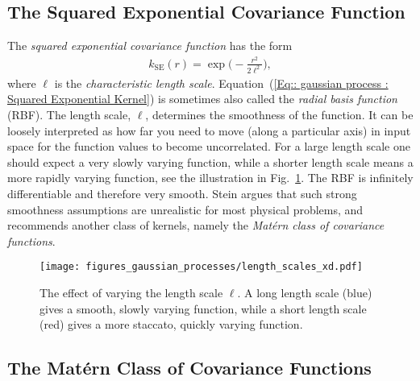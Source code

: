 \documentclass[twoside,english]{uiofysmaster}
\begin{document}
{{\subsection{The Squared Exponential Covariance Function}

The \textit{squared exponential covariance function} has the form 
\begin{align}\label{Eq:: gaussian process : Squared Exponential Kernel}
k_{\mathrm{SE}} (r) = \exp \Big( - \frac{r^2}{2 \ell^2} \Big),
\end{align} 
where $\ell$ is the \textit{characteristic length scale}. Equation~(\ref{Eq:: gaussian process : Squared Exponential Kernel}) is sometimes also called the \textit{radial basis function} (RBF). The length scale, $\ell$, determines the smoothness of the function. It can be loosely interpreted as how far you need to move (along a particular axis) in input space for the function values to become uncorrelated. For a large length scale one should expect a very slowly varying function, while a shorter length scale means a more rapidly varying function, see the illustration in Fig.~\ref{Fig:: gaussian process : ell variation example}. The RBF is infinitely differentiable and therefore very smooth. Stein \cite{steininterpolation} argues that such strong smoothness assumptions are unrealistic for most physical problems, and recommends another class of kernels, namely the \textit{Mat\'{e}rn class of covariance functions}.

\begin{figure}
\centering
\texttt{[image: figures\_gaussian\_processes/length\_scales\_xd.pdf]}
\caption{The effect of varying the length scale $\ell$. A long length scale (blue) gives a smooth, slowly varying function, while a short length scale (red) gives a more staccato, quickly varying function.}
\label{Fig:: gaussian process : ell variation example}
\end{figure}


\subsection{The Mat\'{e}rn Class of Covariance Functions}\label{Sec:: gaussian process : Matern Class of Covariance Functions}

}}
\end{document}
